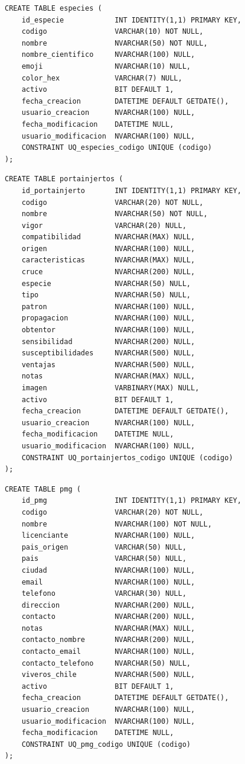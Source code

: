 \documentclass[12pt,a4paper,twoside]{report}
\begin{document}
\begin{lstlisting}[style=sqlstyle, caption={especies}]
CREATE TABLE especies (
    id_especie            INT IDENTITY(1,1) PRIMARY KEY,
    codigo                VARCHAR(10) NOT NULL,
    nombre                NVARCHAR(50) NOT NULL,
    nombre_cientifico     NVARCHAR(100) NULL,
    emoji                 NVARCHAR(10) NULL,
    color_hex             VARCHAR(7) NULL,
    activo                BIT DEFAULT 1,
    fecha_creacion        DATETIME DEFAULT GETDATE(),
    usuario_creacion      NVARCHAR(100) NULL,
    fecha_modificacion    DATETIME NULL,
    usuario_modificacion  NVARCHAR(100) NULL,
    CONSTRAINT UQ_especies_codigo UNIQUE (codigo)
);
\end{lstlisting}

\begin{lstlisting}[style=sqlstyle, caption={portainjertos}]
CREATE TABLE portainjertos (
    id_portainjerto       INT IDENTITY(1,1) PRIMARY KEY,
    codigo                VARCHAR(20) NOT NULL,
    nombre                NVARCHAR(50) NOT NULL,
    vigor                 VARCHAR(20) NULL,
    compatibilidad        NVARCHAR(MAX) NULL,
    origen                NVARCHAR(100) NULL,
    caracteristicas       NVARCHAR(MAX) NULL,
    cruce                 NVARCHAR(200) NULL,
    especie               NVARCHAR(50) NULL,
    tipo                  NVARCHAR(50) NULL,
    patron                NVARCHAR(100) NULL,
    propagacion           NVARCHAR(100) NULL,
    obtentor              NVARCHAR(100) NULL,
    sensibilidad          NVARCHAR(200) NULL,
    susceptibilidades     NVARCHAR(500) NULL,
    ventajas              NVARCHAR(500) NULL,
    notas                 NVARCHAR(MAX) NULL,
    imagen                VARBINARY(MAX) NULL,
    activo                BIT DEFAULT 1,
    fecha_creacion        DATETIME DEFAULT GETDATE(),
    usuario_creacion      NVARCHAR(100) NULL,
    fecha_modificacion    DATETIME NULL,
    usuario_modificacion  NVARCHAR(100) NULL,
    CONSTRAINT UQ_portainjertos_codigo UNIQUE (codigo)
);
\end{lstlisting}

\begin{lstlisting}[style=sqlstyle, caption={pmg}]
CREATE TABLE pmg (
    id_pmg                INT IDENTITY(1,1) PRIMARY KEY,
    codigo                VARCHAR(20) NOT NULL,
    nombre                NVARCHAR(100) NOT NULL,
    licenciante           NVARCHAR(100) NULL,
    pais_origen           VARCHAR(50) NULL,
    pais                  VARCHAR(50) NULL,
    ciudad                NVARCHAR(100) NULL,
    email                 NVARCHAR(100) NULL,
    telefono              VARCHAR(30) NULL,
    direccion             NVARCHAR(200) NULL,
    contacto              NVARCHAR(200) NULL,
    notas                 NVARCHAR(MAX) NULL,
    contacto_nombre       NVARCHAR(200) NULL,
    contacto_email        NVARCHAR(100) NULL,
    contacto_telefono     NVARCHAR(50) NULL,
    viveros_chile         NVARCHAR(500) NULL,
    activo                BIT DEFAULT 1,
    fecha_creacion        DATETIME DEFAULT GETDATE(),
    usuario_creacion      NVARCHAR(100) NULL,
    usuario_modificacion  NVARCHAR(100) NULL,
    fecha_modificacion    DATETIME NULL,
    CONSTRAINT UQ_pmg_codigo UNIQUE (codigo)
);
\end{lstlisting}
\end{document}
